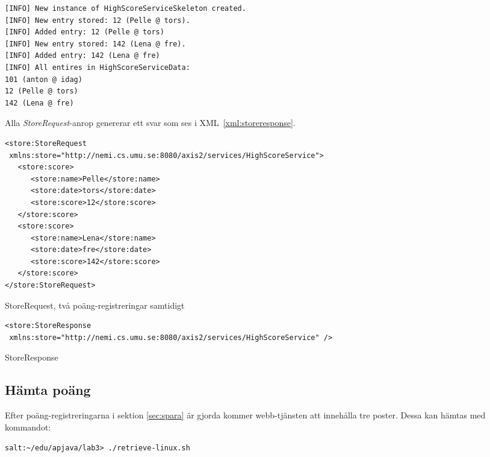 \documentclass[a4paper, 12pt]{article}
\begin{document}
\begin{footnotesize}
\begin{verbatim}
[INFO] New instance of HighScoreServiceSkeleton created.
[INFO] New entry stored: 12 (Pelle @ tors).
[INFO] Added entry: 12 (Pelle @ tors)
[INFO] New entry stored: 142 (Lena @ fre).
[INFO] Added entry: 142 (Lena @ fre)
[INFO] All entires in HighScoreServiceData:
101 (anton @ idag)
12 (Pelle @ tors)
142 (Lena @ fre)
\end{verbatim}
\end{footnotesize}

Alla \textit{StoreRequest}-anrop genererar ett svar som ses i
XML~\ref{xml:storeresponse}.

\begin{xml}
  \begin{footnotesize}
\begin{verbatim}
<store:StoreRequest
 xmlns:store="http://nemi.cs.umu.se:8080/axis2/services/HighScoreService">
   <store:score>
      <store:name>Pelle</store:name>
      <store:date>tors</store:date>
      <store:score>12</store:score>
   </store:score>
   <store:score>
      <store:name>Lena</store:name>
      <store:date>fre</store:date>
      <store:score>142</store:score>
   </store:score>
</store:StoreRequest>
\end{verbatim}
  \end{footnotesize}
  \caption{StoreRequest, två poäng-registreringar samtidigt}\label{xml:store2}
\end{xml}

\begin{xml}
  \begin{footnotesize}
\begin{verbatim}
<store:StoreResponse
 xmlns:store="http://nemi.cs.umu.se:8080/axis2/services/HighScoreService" />
\end{verbatim}
  \end{footnotesize}
  \caption{StoreResponse}\label{xml:storeresponse}
\end{xml}

\subsection{Hämta poäng}
Efter poäng-registreringarna i sektion \ref{sec:spara} är gjorda
kommer webb-tjänsten att innehålla tre poster. Dessa kan hämtas med
kommandot:

\begin{footnotesize}
\verb!salt:~/edu/apjava/lab3> ./retrieve-linux.sh!
\end{footnotesize}
\end{document}
